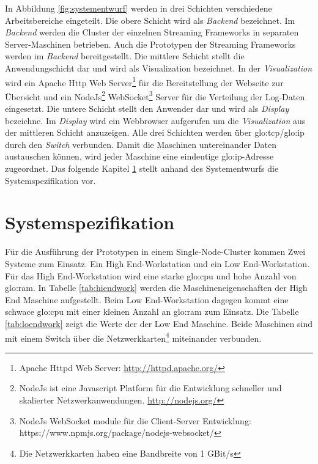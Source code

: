 In Abbildung \ref{fig:systementwurf} werden in drei Schichten verschiedene Arbeitsbereiche eingeteilt. Die obere Schicht wird als \textit{Backend} bezeichnet. Im \textit{Backend} werden die Cluster der einzelnen Streaming Frameworks in separaten Server-Maschinen betrieben. Auch die Prototypen der Streaming Frameworks werden im \textit{Backend} bereitgestellt. Die mittlere Schicht stellt die Anwendungschicht dar und wird als Visualization bezeichnet. In der \textit{Visualization} wird ein Apache Http Web Server\footnote{Apache Httpd Web Server: \url{http://httpd.apache.org/}} für die Bereitstellung der Webseite zur Übersicht und ein NodeJs\footnote{NodeJs ist eine Javascript Platform für die Entwicklung schneller und skalierter Netzwerkanwendungen. \url{http://nodejs.org/}} WebSocket\footnote{NodeJs WebSocket module für die Client-Server Entwicklung: https://www.npmjs.org/package/nodejs-websocket/} Server für die Verteilung der Log-Daten eingesetzt. Die untere Schicht stellt den Anwender dar und wird als \textit{Display} bezeichne. Im \textit{Display} wird ein Webbrowser aufgerufen um die \textit{Visualization} aus der mittleren Schicht anzuzeigen. Alle drei Schichten werden über \gls{glo:tcp}/\gls{glo:ip} durch den \textit{Switch} verbunden. Damit die Maschinen untereinander Daten austauschen können, wird jeder Maschine eine eindeutige \gls{glo:ip}-Adresse zugeordnet. Das folgende Kapitel \ref{sec:systemspezifiaktion} stellt anhand des Systementwurfs die Systemspezifikation vor.


\section{Systemspezifikation}
\label{sec:systemspezifiaktion}

Für die Ausführung der Prototypen in einem Single-Node-Cluster kommen Zwei Systeme zum Einsatz. Ein High End-Workstation und ein Low End-Workstation. Für das High End-Workstation wird eine starke \gls{glo:cpu} und hohe Anzahl von \gls{glo:ram}. In Tabelle \ref{tab:hiendwork} werden die Maschineneigenschaften der High End Maschine aufgestellt. Beim Low End-Workstation dagegen kommt eine schwace \gls{glo:cpu} mit einer kleinen Anzahl an \gls{glo:ram} zum Einsatz. Die Tabelle \ref{tab:loendwork} zeigt die Werte der der Low End Maschine. Beide Maschinen sind mit einem Switch über die Netzwerkkarten\footnote{Die Netzwerkkarten haben eine Bandbreite von 1 GBit/s} miteinander verbunden. 

